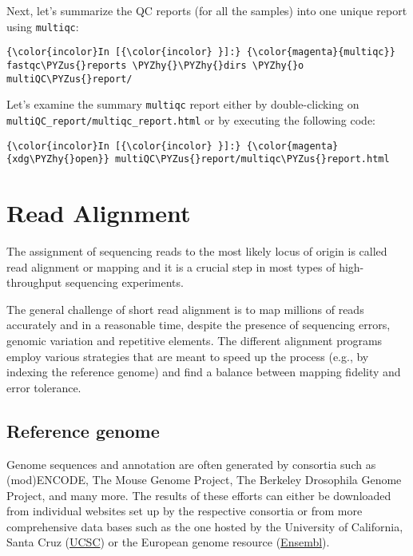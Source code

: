 \documentclass[11pt]{article}
\def\PYZus{\char`\_}
\def\PYZhy{\char`\-}
\begin{document}
    Next, let's summarize the QC reports (for all the samples) into one
unique report using \texttt{multiqc}:

    \begin{Verbatim}[commandchars=\\\{\}]
{\color{incolor}In [{\color{incolor} }]:} {\color{magenta}{multiqc}} fastqc\PYZus{}reports \PYZhy{}\PYZhy{}dirs \PYZhy{}o multiQC\PYZus{}report/
\end{Verbatim}

    Let's examine the summary \texttt{multiqc} report either by
double-clicking on \texttt{multiQC\_report/multiqc\_report.html} or by executing the following code:

    \begin{Verbatim}[commandchars=\\\{\}]
{\color{incolor}In [{\color{incolor} }]:} {\color{magenta}{xdg\PYZhy{}open}} multiQC\PYZus{}report/multiqc\PYZus{}report.html
\end{Verbatim}

    

    \hypertarget{read-alignment}{%
\section{Read Alignment}\label{read-alignment}}

    The assignment of sequencing reads to the most likely locus of origin is
called read alignment or mapping and it is a crucial step in most types
of high-throughput sequencing experiments.

The general challenge of short read alignment is to map millions of
reads accurately and in a reasonable time, despite the presence of
sequencing errors, genomic variation and repetitive elements. The
different alignment programs employ various strategies that are meant to
speed up the process (e.g., by indexing the reference genome) and find a
balance between mapping fidelity and error tolerance.

    \hypertarget{reference-genome}{%
\subsection{Reference genome}\label{reference-genome}}

    Genome sequences and annotation are often generated by consortia such as
(mod)ENCODE, The Mouse Genome Project, The Berkeley Drosophila Genome
Project, and many more. The results of these efforts can either be
downloaded from individual websites set up by the respective consortia
or from more comprehensive data bases such as the one hosted by the
University of California, Santa Cruz (\href{https://genome.ucsc.edu/}{UCSC}) or the European genome
resource (\href{http://www.ensembl.org/}{Ensembl}).
\end{document}
